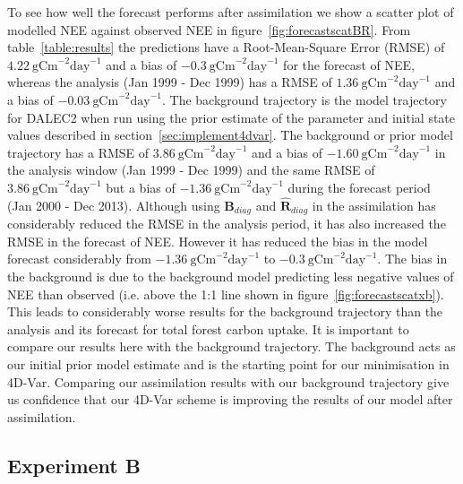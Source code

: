 \documentclass[review]{elsarticle}
\begin{document}
To see how well the forecast performs after assimilation we show a scatter plot of modelled NEE against observed NEE in figure~\ref{fig:forecastscatBR}. From table~\ref{table:results} the predictions have a Root-Mean-Square Error (RMSE) of $4.22 ~\text{gCm}^{-2}\text{day}^{-1}$ and a bias of $-0.3 ~\text{gCm}^{-2}\text{day}^{-1}$ for the forecast of NEE, whereas the analysis (Jan 1999 - Dec 1999) has a RMSE of $1.36 ~\text{gCm}^{-2}\text{day}^{-1}$ and a bias of $-0.03 ~\text{gCm}^{-2}\text{day}^{-1}$. The background trajectory is the model trajectory for DALEC2 when run using the prior estimate of the parameter and initial state values described in section~\ref{sec:implement4dvar}. The background or prior model trajectory has a RMSE of $3.86 ~\text{gCm}^{-2}\text{day}^{-1}$ and a bias of $-1.60 ~\text{gCm}^{-2}\text{day}^{-1}$ in the analysis window (Jan 1999 - Dec 1999) and the same RMSE of $3.86 ~\text{gCm}^{-2}\text{day}^{-1}$ but a bias of $-1.36 ~\text{gCm}^{-2}\text{day}^{-1}$ during the forecast period (Jan 2000 - Dec 2013). Although using $\textbf{B}_{diag}$ and $\hat{\textbf{R}}_{diag}$ in the assimilation has considerably reduced the RMSE in the analysis period, it has also increased the RMSE in the forecast of NEE. However it has reduced the bias in the model forecast considerably from $-1.36 ~\text{gCm}^{-2}\text{day}^{-1}$ to $-0.3 ~\text{gCm}^{-2}\text{day}^{-1}$. The bias in the background is due to the background model predicting less negative values of NEE than observed (i.e. above the 1:1 line shown in figure~\ref{fig:forecastscatxb}). This leads to considerably worse results for the background trajectory than the analysis and its forecast for total forest carbon uptake. It is important to compare our results here with the background trajectory. The background acts as our initial prior model estimate and is the starting point for our minimisation in 4D-Var. Comparing our assimilation results with our background trajectory give us confidence that our 4D-Var scheme is improving the results of our model after assimilation.

\subsection{Experiment B} \label{sec:expb}
\end{document}
